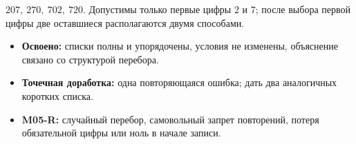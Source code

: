 \begin{teacherbox}[7. Итог]
  \(207,\ 270,\ 702,\ 720\). Допустимы только первые цифры \(2\) и \(7\);
  после выбора первой цифры две оставшиеся располагаются двумя способами.
\end{teacherbox}

\begin{resultbox}
  \begin{itemize}
    \item \textbf{Освоено:} списки полны и упорядочены, условия не изменены,
      объяснение связано со структурой перебора.
    \item \textbf{Точечная доработка:} одна повторяющаяся ошибка; дать два
      аналогичных коротких списка.
    \item \textbf{M05-R:} случайный перебор, самовольный запрет повторений,
      потеря обязательной цифры или ноль в начале записи.
  \end{itemize}
\end{resultbox}

